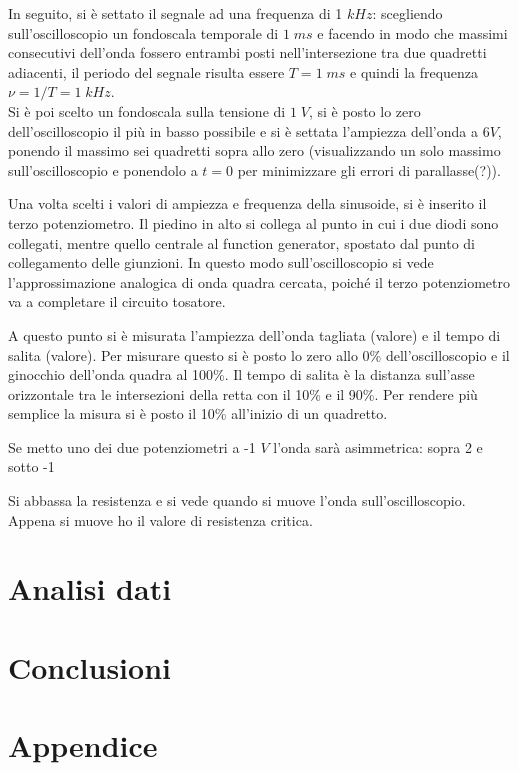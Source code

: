 \documentclass[11pt]{article}
\begin{document}
	In seguito, si è settato il segnale ad una frequenza di 1 $kHz$: scegliendo sull'oscilloscopio un fondoscala temporale di $1 \; ms$  e facendo in modo che massimi consecutivi dell'onda fossero entrambi posti nell'intersezione tra due quadretti adiacenti, il periodo del segnale risulta essere $T = 1 \; ms$ e quindi la frequenza $\nu = 1/T = 1 \; kHz$.\\
	Si è poi scelto un fondoscala sulla tensione di $1 \; V$, si è posto lo zero dell'oscilloscopio il più in basso possibile e si è settata l'ampiezza dell'onda a $6 V$, ponendo il massimo sei quadretti sopra allo zero (visualizzando un solo massimo sull'oscilloscopio e ponendolo a $t =0$ per minimizzare gli errori di parallasse(?)).
	
	Una volta scelti i valori di ampiezza e frequenza della sinusoide, si è inserito il terzo potenziometro. Il piedino in alto si collega al punto in cui i due diodi sono collegati, mentre quello centrale al function generator, spostato dal punto di collegamento delle giunzioni. In questo modo sull'oscilloscopio si vede l'approssimazione analogica di onda quadra cercata, poiché il terzo potenziometro va a completare il circuito tosatore.
	
	A questo punto si è misurata l'ampiezza dell'onda tagliata (valore) e il tempo di salita (valore). Per misurare questo si è posto lo zero allo 0\% dell'oscilloscopio e il ginocchio dell'onda quadra al 100\%. Il tempo di salita è la distanza sull'asse orizzontale tra le intersezioni della retta con il 10\% e il 90\%. Per rendere più semplice la misura si è posto il 10\% all'inizio di un quadretto.

	Se metto uno dei due potenziometri a -1 $V$ l'onda sarà asimmetrica: sopra 2 e sotto -1
	
	Si abbassa la resistenza e si vede quando si muove l'onda sull'oscilloscopio. Appena si muove ho il valore di resistenza critica.
	
	\section{Analisi dati}
	\section{Conclusioni}
	\section{Appendice}
	
\end{document}
